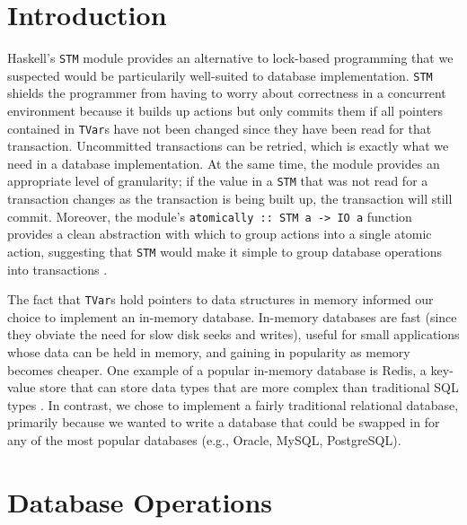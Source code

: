 \documentclass[10pt]{article}
\begin{document}
\vspace{5mm}
\begin{multicols}{2}

\section{Introduction} 
Haskell's \texttt{STM} module provides an alternative to lock-based programming that we suspected would be particularily well-suited to database implementation. \texttt{STM} shields the programmer from having to worry about correctness in a concurrent environment because it builds up actions but only commits them if all pointers contained in \texttt{TVar}s have not been changed since they have been read for that transaction. Uncommitted transactions can be retried, which is exactly what we need in a database implementation. At the same time, the module provides an appropriate level of granularity; if the value in a \texttt{STM} that was not read for a transaction changes as the transaction is being built up, the transaction will still commit. Moreover, the module's \texttt{atomically :: STM a -> IO a} function provides a clean abstraction with which to group actions into a single atomic action, suggesting that \texttt{STM} would make it simple to group database operations into transactions \cite{harris}. 

The fact that \texttt{TVar}s hold pointers to data structures in memory informed our choice to implement an in-memory database. In-memory databases are fast (since they obviate the need for slow disk seeks and writes), useful for small applications whose data can be held in memory, and gaining in popularity as memory becomes cheaper. One example of a popular in-memory database is Redis, a key-value store that can store data types that are more complex than traditional SQL types \cite{redis}. In contrast, we chose to implement a fairly traditional relational database, primarily because we wanted to write a database that could be swapped in for any of the most popular databases (e.g., Oracle, MySQL, PostgreSQL). 

\section{Database Operations}

\end{multicols}
\end{document}

